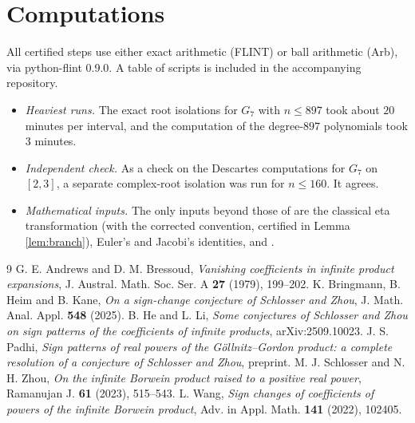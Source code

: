 \documentclass[11pt]{amsart}
\theoremstyle{remark}
\begin{document}
\section{Computations}
All certified steps use either exact arithmetic (FLINT) or ball arithmetic (Arb), via python-flint 0.9.0. A table of scripts is included in the accompanying repository.
\begin{itemize}[leftmargin=2em]
\item \emph{Heaviest runs.} The exact root isolations for $G_7$ with $n\le897$ took about $20$ minutes per interval, and the computation of the degree-$897$ polynomials took $3$ minutes.
\item \emph{Independent check.} As a check on the Descartes computations for $G_7$ on $[2,3]$, a separate complex-root isolation was run for $n\le160$. It agrees.
\item \emph{Mathematical inputs.} The only inputs beyond those of \cite{P1} are the classical eta transformation (with the corrected convention, certified in Lemma \ref{lem:branch}), Euler's and Jacobi's identities, and \cite{AB}.
\end{itemize}

\begin{thebibliography}{9}
 G. E. Andrews and D. M. Bressoud, \emph{Vanishing coefficients in infinite product expansions}, J. Austral. Math. Soc. Ser. A \textbf{27} (1979), 199--202.
 K. Bringmann, B. Heim and B. Kane, \emph{On a sign-change conjecture of Schlosser and Zhou}, J. Math. Anal. Appl. \textbf{548} (2025).
 B. He and L. Li, \emph{Some conjectures of Schlosser and Zhou on sign patterns of the coefficients of infinite products}, arXiv:2509.10023.
 J. S. Padhi, \emph{Sign patterns of real powers of the G\"ollnitz--Gordon product: a complete resolution of a conjecture of Schlosser and Zhou}, preprint.
 M. J. Schlosser and N. H. Zhou, \emph{On the infinite Borwein product raised to a positive real power}, Ramanujan J. \textbf{61} (2023), 515--543.
 L. Wang, \emph{Sign changes of coefficients of powers of the infinite Borwein product}, Adv. in Appl. Math. \textbf{141} (2022), 102405.
\end{thebibliography}
\end{document}
